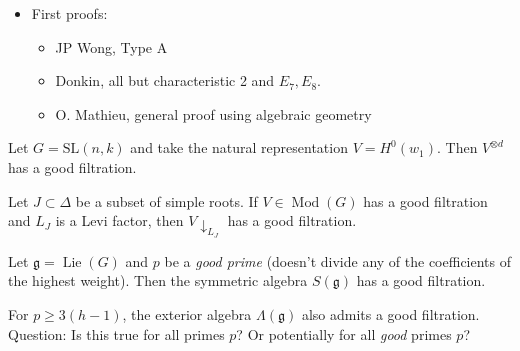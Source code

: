 \begin{itemize}
\tightlist
\item
  First proofs:

  \begin{itemize}
  \tightlist
  \item
    JP Wong, Type A
  \item
    Donkin, all but characteristic 2 and \(E_7, E_8\).
  \item
    O. Mathieu, general proof using algebraic geometry
  \end{itemize}
\end{itemize}

\begin{example}

\begin{example}

Let \(G = {\text{SL}}(n, k)\) and take the natural representation
\(V = H^0(w_1)\). Then \(V^{\otimes d}\) has a good filtration.

\end{example}

\end{example}

\begin{theorem}[?]

\begin{theorem}[?]

Let \(J\subset \Delta\) be a subset of simple roots. If
\(V \in {\operatorname{Mod}}(G)\) has a good filtration and \(L_J\) is a
Levi factor, then \(V{\downarrow_{L_J}}\) has a good filtration.

\end{theorem}

\end{theorem}

\begin{theorem}[?]

\begin{theorem}[?]

Let \({\mathfrak{g}}= \operatorname{Lie}(G)\) and \(p\) be a \emph{good
prime} (doesn't divide any of the coefficients of the highest weight).
Then the symmetric algebra \(S({\mathfrak{g}})\) has a good filtration.

\end{theorem}

\end{theorem}

\begin{remark}

\begin{remark}

For \(p\geq 3(h-1)\), the exterior algebra \(\Lambda({\mathfrak{g}})\)
also admits a good filtration. Question: Is this true for all primes
\(p\)? Or potentially for all \emph{good} primes \(p\)?

\end{remark}

\end{remark}

